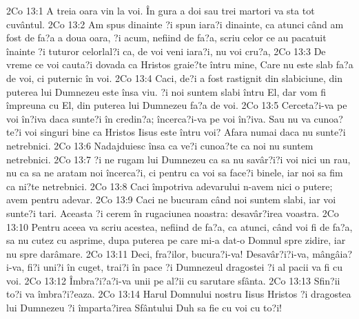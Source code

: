 2Co 13:1  A treia oara vin la voi. În gura a doi sau trei martori va sta tot cuvântul.
2Co 13:2  Am spus dinainte ?i spun iara?i dinainte, ca atunci când am fost de fa?a a doua oara, ?i acum, nefiind de fa?a, scriu celor ce au pacatuit înainte ?i tuturor celorlal?i ca, de voi veni iara?i, nu voi cru?a,
2Co 13:3  De vreme ce voi cauta?i dovada ca Hristos graie?te întru mine, Care nu este slab fa?a de voi, ci puternic în voi.
2Co 13:4  Caci, de?i a fost rastignit din slabiciune, din puterea lui Dumnezeu este însa viu. ?i noi suntem slabi întru El, dar vom fi împreuna cu El, din puterea lui Dumnezeu fa?a de voi.
2Co 13:5  Cerceta?i-va pe voi în?iva daca sunte?i în credin?a; încerca?i-va pe voi în?iva. Sau nu va cunoa?te?i voi singuri bine ca Hristos Iisus este întru voi? Afara numai daca nu sunte?i netrebnici.
2Co 13:6  Nadajduiesc însa ca ve?i cunoa?te ca noi nu suntem netrebnici.
2Co 13:7  ?i ne rugam lui Dumnezeu ca sa nu savâr?i?i voi nici un rau, nu ca sa ne aratam noi încerca?i, ci pentru ca voi sa face?i binele, iar noi sa fim ca ni?te netrebnici.
2Co 13:8  Caci împotriva adevarului n-avem nici o putere; avem pentru adevar.
2Co 13:9  Caci ne bucuram când noi suntem slabi, iar voi sunte?i tari. Aceasta ?i cerem în rugaciunea noastra: desavâr?irea voastra.
2Co 13:10  Pentru aceea va scriu acestea, nefiind de fa?a, ca atunci, când voi fi de fa?a, sa nu cutez cu asprime, dupa puterea pe care mi-a dat-o Domnul spre zidire, iar nu spre darâmare.
2Co 13:11  Deci, fra?ilor, bucura?i-va! Desavâr?i?i-va, mângâia?i-va, fi?i uni?i în cuget, trai?i în pace ?i Dumnezeul dragostei ?i al pacii va fi cu voi.
2Co 13:12  Îmbra?i?a?i-va unii pe al?ii cu sarutare sfânta.
2Co 13:13  Sfin?ii to?i va îmbra?i?eaza.
2Co 13:14  Harul Domnului nostru Iisus Hristos ?i dragostea lui Dumnezeu ?i împarta?irea Sfântului Duh sa fie cu voi cu to?i!


